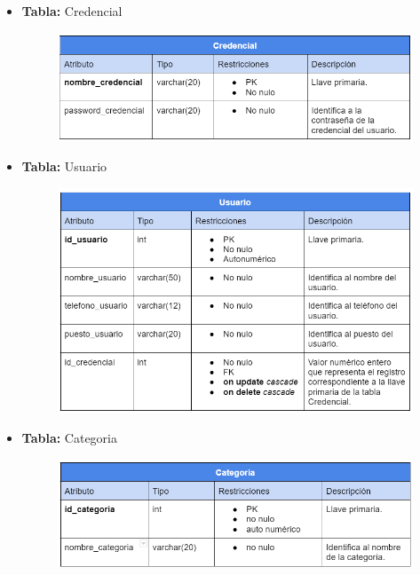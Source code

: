 \documentclass[10pt,a4paper]{article}
\begin{document}
\begin{itemize}
	\item \textbf{Tabla:} Credencial
			\begin{figure}[H]
				\includegraphics[scale=.54]{tablaCredencial}
				\centering
				\label{img:tablaCredencial}
			\end{figure} 
			
	\item \textbf{Tabla:} Usuario
			\begin{figure}[H]
				\includegraphics[scale=.54]{tablaUsuario}
				\centering
				\label{img:tablaUsuario}
			\end{figure} 
			
	\item \textbf{Tabla:} Categoria
			\begin{figure}[H]
				\includegraphics[scale=.54]{tablaCategoria}
				\centering
				\label{img:tablaCategoria}
			\end{figure} 


\end{itemize}
\end{document}
